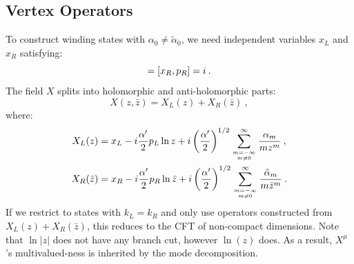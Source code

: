 \subsection*{Vertex Operators}
To construct winding states with $\alpha_{0} \neq \tilde{\alpha}_{0}$, we need independent variables $x_{L}$ and $x_{R}$ satisfying:
\begin{equation}
	[x_{L}, p_{L}]=[x_{R}, p_{R}]=\mi \:. \label{8.2.14}
\end{equation}
The field $X$ splits into holomorphic and anti-holomorphic parts:
\begin{equation}
	X(z, \bar{z})=X_{L}(z)+X_{R}(\bar{z}) \:, \label{8.2.15}
\end{equation}
where:
\begin{subequations} \label{8.2.16}
	\begin{align}
		X_{L}(z) &= x_{L}- i \frac{\alpha^{\prime}}{2} p_{L} \ln z+i\left(\frac{\alpha^{\prime}}{2}\right)^{1 / 2} 
		\sum_{m=-\infty \atop m \neq 0}^{\infty} \frac{\alpha_{m}}{m z^{m}} \:, \label{8.2.16a} \\
		X_{R}(\bar{z})&= x_{R}-i \frac{\alpha^{\prime}}{2} p_{R} \ln \bar{z}+i\left(\frac{\alpha^{\prime}}{2}\right)^{1 / 2} 
		\sum_{m=-\infty \atop m \neq 0}^{\infty} \frac{\tilde{\alpha}_{m}}{m \bar{z}^{m}} \:. \label{8.2.16b}
	\end{align}
\end{subequations}
If we restrict to states with $k_{L}=k_{R}$ and only use operators constructed from $X_{L}(z)+X_{R}(\bar{z})$, this reduces to the CFT of non-compact dimensions. Note that $\ln|z|$ does not have any branch cut, however $\ln(z)$ does. As a result, $X^{\mu}$'s multivalued-ness is inherited by the mode decomposition.

